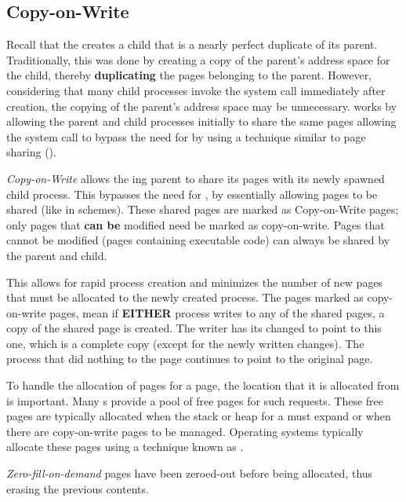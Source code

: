 \subsection{Copy-on-Write}\label{subsec:Memory_Copy_on_Write}
Recall that the   creates a child  that is a nearly perfect duplicate of its parent.
Traditionally, this was done by creating a copy of the parent’s address space for the child, thereby \textbf{duplicating} the pages belonging to the parent.
However, considering that many child processes invoke the  system call immediately after creation, the copying of the parent’s address space may be unnecessary.
 works by allowing the parent and child processes initially to share the same pages allowing the  system call to bypass the need for  by using a technique similar to page sharing ().

\begin{definition}\label{def:Memory_Copy_on_Write}
  \emph{Copy-on-Write} allows the ing parent  to share its pages with its newly spawned child process.
  This bypasses the need for , by essentially allowing pages to be shared (like in  schemes).
  These shared pages are marked as Copy-on-Write pages; only pages that \textbf{can be} modified need be marked as copy-on-write.
  Pages that cannot be modified (pages containing executable code) can always be shared by the parent and child.

  This allows for rapid process creation and minimizes the number of new pages that must be allocated to the newly created process.
  The pages marked as copy-on-write pages, mean if \textbf{EITHER} process writes to any of the shared pages, a copy of the shared page is created.
  The writer has its  changed to point to this one, which is a complete copy (except for the newly written changes).
  The process that did nothing to the page continues to point to the original page.
\end{definition}

To handle the allocation of pages for a  page, the location that it is allocated from is important.
Many s provide a pool of free pages for such requests.
These free pages are typically allocated when the stack or heap for a  must expand or when there are copy-on-write pages to be managed.
Operating systems typically allocate these pages using a technique known as .

\begin{definition}\label{def:Zero_Fill_on_Demand}
  \emph{Zero-fill-on-demand} pages have been zeroed-out before being allocated, thus erasing the previous contents.
\end{definition}


